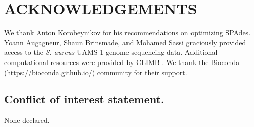 \documentclass[a4,center,fleqn]{NAR}
\begin{document}
\section{ACKNOWLEDGEMENTS}
We thank Anton Korobeynikov for his recommendations on optimizing SPAdes. Yoann Augagneur, Shaun Brinsmade, and Mohamed Sassi graciously provided access to the \textit{S. aureus} UAMS-1 genome sequencing data.  Additional computational resources were provided by CLIMB \cite{Connor2016}. We thank the Bioconda (\url{https://bioconda.github.io/}) community for their support.


\subsection{Conflict of interest statement.}
None declared.



\end{document}
